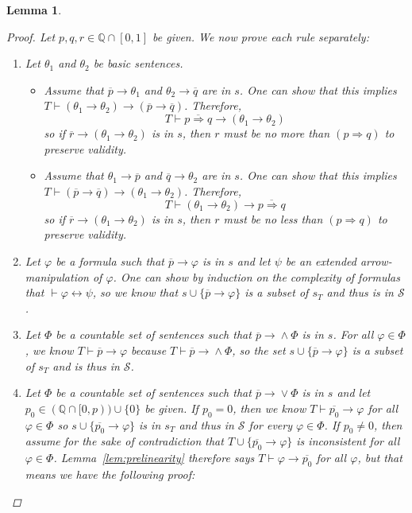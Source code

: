 \documentclass{amsart}
\newtheorem{lemma}[theorem]{Lemma}
\theoremstyle{definition}
\numberwithin{equation}{theorem}
\renewcommand{\phi}{\varphi}
\newcommand{\Q}{\mathbb{Q}}
\newcommand{\unvee}{{\vee}}
\newcommand{\unwedge}{{\wedge}}
\newcommand{\proves}{\vdash}
\newcommand{\rat}[1]{{\overline{#1}}}
\newcommand{\narrow}[1]{\xrightarrow{#1}}
\renewcommand{\to}{\narrow{}}
\begin{document}
\begin{lemma}
\begin{proof}
    Let $p,q,r\in\Q\cap[0,1]$ be given.
    We now prove each rule separately:
    \begin{enumerate}[label=(CP\arabic*)]
    \item
      Let $\theta_1$ and $\theta_2$ be basic sentences.
      \begin{itemize}
      \item
        Assume that $\rat p\to\theta_1$ and $\theta_2\to\rat q$ are in $s$.
        One can show that this implies $T\proves(\theta_1\to\theta_2)\to(\rat p\to\rat q)$.
        Therefore,
        \[
          T\proves\rat{p\Rightarrow q}\to(\theta_1\to\theta_2)
        \]
        so if $\rat r\to(\theta_1\to\theta_2)$ is in $s$, then $r$ must be no more than $(p\Rightarrow q)$ to preserve validity.
      \item 
        Assume that $\theta_1\to\rat p$ and $\rat q\to\theta_2$ are in $s$.
        One can show that this implies $T\proves(\rat p\to\rat q)\to(\theta_1\to\theta_2)$.
        Therefore,
        \[
          T\proves(\theta_1\to\theta_2)\to\rat{p\Rightarrow q}
        \]
        so if $\rat r\to(\theta_1\to\theta_2)$ is in $s$, then $r$ must be no less than $(p\Rightarrow q)$ to preserve validity.
      \end{itemize}
	  \item
	    Let $\phi$ be a formula such that $\rat p\to\phi$ is in $s$ and let $\psi$ be an extended arrow-manipulation of $\phi$.
      One can show by induction on the complexity of formulas that $\proves\phi\leftrightarrow\psi$, so we know that $s\cup\{\rat p\to\phi\}$ is a subset of $s_T$ and thus is in $\mathscr{S}$.
    \item 
	    Let $\Phi$ be a countable set of sentences such that $\rat p\to\unwedge\Phi$ is in $s$.
	    For all $\phi\in\Phi$, we know $T\proves\rat p\to\phi$ because $T\proves\rat p\to\unwedge\Phi$, so the set $s\cup\{\rat p\to\phi\}$ is a subset of $s_T$ and is thus in $\mathscr{S}$.
	  \item
	    Let $\Phi$ be a countable set of sentences such that $\rat p\to\unvee\Phi$ is in $s$ and let $p_0\in(\Q\cap[0,p))\cup\{0\}$ be given.
	    If $p_0=0$, then we know $T\proves\rat{p_0}\to\phi$ for all $\phi\in\Phi$ so $s\cup\{\rat{p_0}\to\phi\}$ is in $s_T$ and thus in $\mathscr{S}$ for every $\phi\in\Phi$.
	    If $p_0\neq 0$, then assume for the sake of contradiction that $T\cup\{\rat{p_0}\to\phi\}$ is inconsistent for all $\phi\in\Phi$.
	    Lemma~\ref{lem:prelinearity} therefore says $T\proves\phi\to\rat{p_0}$ for all $\phi$, but that means we have the following proof:

\end{enumerate}
\end{proof}
\end{lemma}
\end{document}
